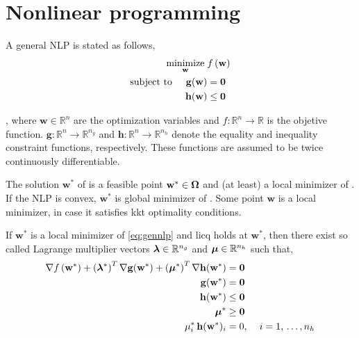 \section{Nonlinear programming}
\label{section:nonlinearopt}

A general NLP \cite{diehlnumericalocp} is stated as follows,
\begin{subequations} \label{eq:gennlp}
	\begin{align}
		\underset{\mathbf{w}}{\text{minimize}} \hspace{1mm} &f\left(\mathbf{w}\right)  \\
		\text{subject to} \hspace{5mm} \mathbf{g}(\mathbf{w}) &= \mathbf{0}\\
			\mathbf{h}(\mathbf{w}) &\leq \mathbf{0}
	\end{align}
\end{subequations}

\noindent , where $\mathbf{w} \in \mathbb{R}^n$ are the optimization variables and $f:\mathbb{R}^n \to \mathbb{R}$ is the objetive function. $\mathbf{g}:\mathbb{R}^n \to \mathbb{R}^{n_g}$ and $\mathbf{h}:\mathbb{R}^n \to \mathbb{R}^{n_h}$ denote the equality and inequality constraint functions, respectively. These functions are assumed to be twice continuously differentiable.

The solution $\mathbf{w}^*$ of  is a feasible point $\mathbf{w}^* \in \feasibleSet$ and (at least) a local minimizer of . If the NLP is convex, $\mathbf{w}^*$ is global minimizer of . Some point $\mathbf{w}$ is a local minimizer, in case it satisfies \acrlong{kkt} optimality conditions.

\begin{theorem}
\label{theorem:kkt}
If $\mathbf{w}^*$ is a local minimizer of \ref{eq:gennlp} and \acrshort{licq} holds at $\mathbf{w}^*$, then there exist so called Lagrange multiplier vectors $\bm{\gmultiplier} \in \mathbb{R}^{n_g}$ and $\bm{\hmultiplier} \in \mathbb{R}^{n_h}$ such that,
\begin{subequations} \label{eq:kkt}
\begin{align}
\nabla f\left(\mathbf{w}^*\right) + \left(\bm{\gmultiplier}^*\right)^T \nabla\eqCon{\mathbf{w}^*} + \left( \bm{\hmultiplier}^* \right)^T \nabla\ineqCon{\mathbf{w}^*} &= \mathbf{0} \label{subeq:lagrangegrad} \\
\eqCon{\mathbf{w}^*} &= \mathbf{0} \label{subeq:eqcon}\\
\ineqCon{\mathbf{w}^*} &\leq \mathbf{0} \label{subeq:compcond1}\\
\bm{\hmultiplier}^* &\geq \mathbf{0} \label{subeq:compcond2}\\
\hmultiplier_i^* \, \ineqCon{\mathbf{w}^*}_i &= 0, \hspace{4mm} i = 1,\,\ldots,n_h \label{subeq:compcond3}
\end{align}
\end{subequations}
\end{theorem}

